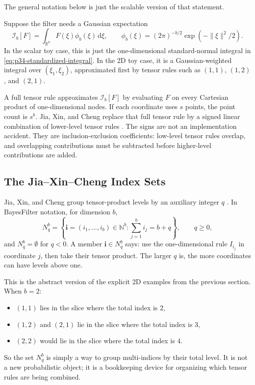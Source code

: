 \documentclass[11pt]{article}
\numberwithin{equation}{section}
\newcommand{\R}{\mathbb R}
\newcommand{\dd}{\,\mathrm d}
\begin{document}
The general notation below is just the scalable version of that statement.

Suppose the filter needs a Gaussian expectation
\begin{equation}
  \mathcal I_b[F]
  =
  \int_{\R^b}F(\xi)\phi_b(\xi)\dd\xi,
  \qquad
  \phi_b(\xi)=(2\pi)^{-b/2}\exp(-\|\xi\|^2/2).
  \label{eq:p32-gaussian-integral-target}
\end{equation}
In the scalar toy case, this is just the one-dimensional standard-normal integral
in \eqref{eq:p34-standardized-integral}.  In the 2D toy case, it is a
Gaussian-weighted integral over \((\xi_1,\xi_2)\), approximated first by tensor
rules such as \((1,1)\), \((1,2)\), and \((2,1)\).

A full tensor rule approximates \(\mathcal I_b[F]\) by evaluating \(F\) on
every Cartesian product of one-dimensional nodes.  If each coordinate uses
\(s\) points, the point count is \(s^b\).  Jia, Xin, and Cheng replace that
full tensor rule by a signed linear combination of lower-level tensor rules
\cite[Section 3.1]{jia2012sparsegrid}.  The signs are not an implementation
accident.  They are inclusion-exclusion coefficients: low-level tensor rules
overlap, and overlapping contributions must be subtracted before higher-level
contributions are added.

\subsection{The Jia--Xin--Cheng Index Sets}
\label{subsec:p32-source-index-sets}

Jia, Xin, and Cheng group tensor-product levels by an auxiliary integer \(q\)
\cite[Eq. 27]{jia2012sparsegrid}.  In BayesFilter notation, for dimension
\(b\),
\begin{equation}
  N_q^b
  =
  \left\{\mathbf i=(i_1,\ldots,i_b)\in\mathbb N^b:
  \sum_{j=1}^b i_j=b+q\right\},
  \qquad q\ge 0,
  \label{eq:p32-Nqb}
\end{equation}
and \(N_q^b=\emptyset\) for \(q<0\).  A member
\(\mathbf i\in N_q^b\) says: use the one-dimensional rule \(I_{i_j}\) in
coordinate \(j\), then take their tensor product.  The larger \(q\) is, the
more coordinates can have levels above one.

This is the abstract version of the explicit 2D examples from the previous
section.  When \(b=2\):
\begin{itemize}[leftmargin=0.28in]
  \item \((1,1)\) lies in the slice where the total index is \(2\),
  \item \((1,2)\) and \((2,1)\) lie in the slice where the total index is
  \(3\),
  \item \((2,2)\) would lie in the slice where the total index is \(4\).
\end{itemize}
So the set \(N_q^b\) is simply a way to group multi-indices by their total
level.  It is not a new probabilistic object; it is a bookkeeping device for
organizing which tensor rules are being combined.
\end{document}
